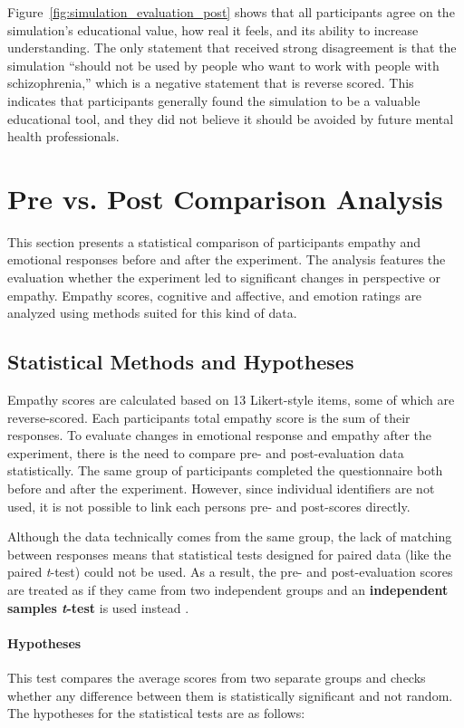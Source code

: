 Figure~\ref{fig:simulation_evaluation_post} shows that all participants agree on the simulation's educational value, how real it feels, and its ability to increase understanding. The only statement that received strong disagreement is that the simulation “should not be used by people who want to work with people with schizophrenia,” which is a negative statement that is reverse scored. This indicates that participants generally found the simulation to be a valuable educational tool, and they did not believe it should be avoided by future mental health professionals.

\section{Pre vs. Post Comparison Analysis}
\label{sec:pre_post_comparison}
This section presents a statistical comparison of participants empathy and emotional responses before and after the experiment. The analysis features the evaluation whether the experiment led to significant changes in perspective or empathy. Empathy scores, cognitive and affective, and emotion ratings are analyzed using methods suited for this kind of data.

\subsection{Statistical Methods and Hypotheses}

Empathy scores are calculated based on 13 Likert-style items, some of which are reverse-scored. Each participants total empathy score is the sum of their responses. To evaluate changes in emotional response and empathy after the experiment, there is the need to compare pre- and post-evaluation data statistically. The same group of participants completed the questionnaire both before and after the experiment. However, since individual identifiers are not used, it is not possible to link each persons pre- and post-scores directly.

Although the data technically comes from the same group, the lack of matching between responses means that statistical tests designed for paired data (like the paired \textit{t}-test) could not be used. As a result, the pre- and post-evaluation scores are treated as if they came from two independent groups and an \textbf{independent samples \textit{t}-test} is used instead \cite{independentTtest}.

\paragraph{Hypotheses} This test compares the average scores from two separate groups and checks whether any difference between them is statistically significant and not random. The hypotheses for the statistical tests are as follows:

